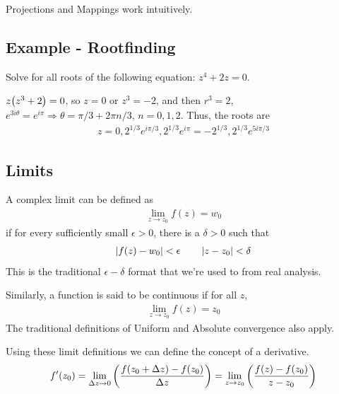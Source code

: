     Projections and Mappings work intuitively.

    \subsection{Example - Rootfinding}
    Solve for all roots of the following equation: $z^4 + 2z = 0$.

    $z{\left( z^3 + 2 \right)} = 0$, so $z=0$ or $z^3 = -2$, and then $r^3=2$,
    $e^{3i\theta}=e^{i\pi}\Rightarrow\theta=\pi/3 + 2\pi n / 3$, $n=0, 1,
    2.$ Thus, the roots are
    \begin{align*}
        z = 0, 2^{1/3} e^{i \pi / 3}, 2^{1/3}e^{i \pi} = -2^{1/3},
        2^{1/3}e^{5i\pi / 3}
    \end{align*}

    \subsection{Limits}

    \begin{thm}
        A complex limit can be defined as
        \begin{align*}
            \lim_{z\to z_0} f(z) = w_0
        \end{align*}
        if for every sufficiently small $\epsilon > 0$, there is a $\delta > 0$
        such that
        \begin{align*}
            \left\lvert f(z) - w_0 \right\rvert < \epsilon \qquad \left\lvert z - z_0 \right\rvert < \delta
        \end{align*}
        This is the traditional $\epsilon-\delta$ format that we're used to from
        real analysis.
    \end{thm}

    Similarly, a function is said to be continuous if for all $z$,
    \begin{align*}
        \lim_{z\to z_0} f(z) = z_0
    \end{align*}
    The traditional definitions of Uniform and Absolute convergence also apply.

    Using these limit definitions we can define the concept of a derivative.
    \begin{align*}
        f^\prime (z_0) = \lim_{\Delta z \to 0}
            {\left( \frac{f(z_0 + \Delta z) - f(z_0)}{\Delta z} \right)} =
        \lim_{z \to z_0}
            {\left( \frac{f(z) - f(z_0)}{z-z_0} \right)}
    \end{align*}

